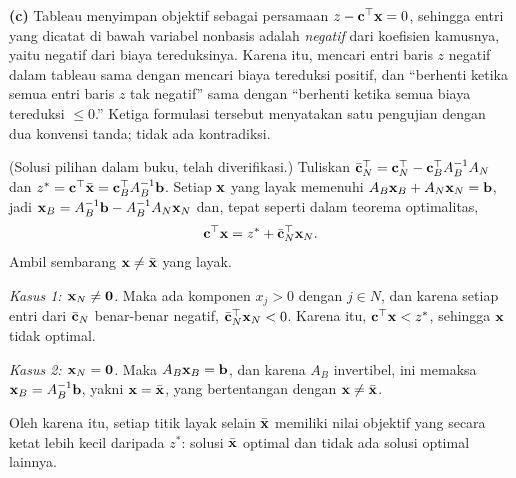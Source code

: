 \textbf{(c)} Tableau menyimpan objektif sebagai persamaan
$z - \mathbf{c}^\top\mathbf{x} = 0$, sehingga entri yang dicatat di bawah variabel nonbasis
adalah \emph{negatif} dari koefisien kamusnya, yaitu negatif dari biaya
tereduksinya. Karena itu, mencari entri baris $z$ negatif dalam tableau sama
dengan mencari biaya tereduksi positif, dan ``berhenti ketika semua entri baris
$z$ tak negatif'' sama dengan ``berhenti ketika semua biaya tereduksi
$\leq 0$.'' Ketiga formulasi tersebut menyatakan satu pengujian dengan dua
konvensi tanda; tidak ada kontradiksi.


(Solusi pilihan dalam buku, telah diverifikasi.) Tuliskan
$\bar{\mathbf{c}}_N^\top = \mathbf{c}_N^\top - \mathbf{c}_B^\top A_B^{-1} A_N$ dan
$z^* = \mathbf{c}^\top \bar{\mathbf{x}} = \mathbf{c}_B^\top A_B^{-1} \mathbf{b}$. Setiap $\mathbf{x}$ yang layak
memenuhi $A_B \mathbf{x}_B + A_N \mathbf{x}_N = \mathbf{b}$, jadi
$\mathbf{x}_B = A_B^{-1}\mathbf{b} - A_B^{-1}A_N \mathbf{x}_N$ dan, tepat seperti dalam teorema
optimalitas,
\[
\mathbf{c}^\top \mathbf{x} = z^* + \bar{\mathbf{c}}_N^\top \mathbf{x}_N .
\]
Ambil sembarang $\mathbf{x} \neq \bar{\mathbf{x}}$ yang layak.

\emph{Kasus 1: $\mathbf{x}_N \neq \mathbf{0}$.} Maka ada komponen $x_j > 0$ dengan
$j \in N$, dan karena setiap entri dari $\bar{\mathbf{c}}_N$ benar-benar negatif,
$\bar{\mathbf{c}}_N^\top \mathbf{x}_N < 0$. Karena itu, $\mathbf{c}^\top \mathbf{x} < z^*$, sehingga $\mathbf{x}$
tidak optimal.

\emph{Kasus 2: $\mathbf{x}_N = \mathbf{0}$.} Maka $A_B \mathbf{x}_B = \mathbf{b}$, dan karena $A_B$
invertibel, ini memaksa $\mathbf{x}_B = A_B^{-1}\mathbf{b}$, yakni $\mathbf{x} = \bar{\mathbf{x}}$, yang
bertentangan dengan $\mathbf{x} \neq \bar{\mathbf{x}}$.

Oleh karena itu, setiap titik layak selain $\bar{\mathbf{x}}$ memiliki nilai objektif
yang secara ketat lebih kecil daripada $z^*$: solusi $\bar{\mathbf{x}}$ optimal dan tidak
ada solusi optimal lainnya.
